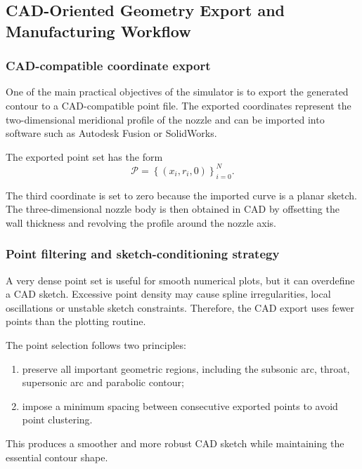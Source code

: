 \documentclass[11pt,a4paper]{article}
\begin{document}
\subsection{CAD-Oriented Geometry Export and Manufacturing Workflow}


\subsubsection{CAD-compatible coordinate export}

One of the main practical objectives of the simulator is to export the generated contour to a CAD-compatible point file. The exported coordinates represent the two-dimensional meridional profile of the nozzle and can be imported into software such as Autodesk Fusion or SolidWorks.

The exported point set has the form
\begin{equation}
\mathcal{P}=\left\{(x_i,r_i,0)\right\}_{i=0}^{N}.
\end{equation}

The third coordinate is set to zero because the imported curve is a planar sketch. The three-dimensional nozzle body is then obtained in CAD by offsetting the wall thickness and revolving the profile around the nozzle axis.

\subsubsection{Point filtering and sketch-conditioning strategy}

A very dense point set is useful for smooth numerical plots, but it can overdefine a CAD sketch. Excessive point density may cause spline irregularities, local oscillations or unstable sketch constraints. Therefore, the CAD export uses fewer points than the plotting routine.

The point selection follows two principles:
\begin{enumerate}
    \item preserve all important geometric regions, including the subsonic arc, throat, supersonic arc and parabolic contour;
    \item impose a minimum spacing between consecutive exported points to avoid point clustering.
\end{enumerate}

This produces a smoother and more robust CAD sketch while maintaining the essential contour shape.
\end{document}
